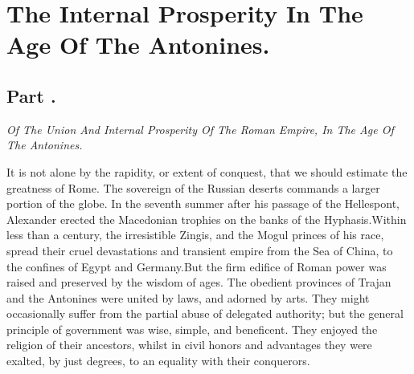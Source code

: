 \chapter{The Internal Prosperity In The Age Of The Antonines.}
\section{Part \thesection.}

\textit{Of The Union And Internal Prosperity Of The Roman Empire, In The
Age Of The Antonines.}
\vspace{\onelineskip}

It is not alone by the rapidity, or extent of conquest, that we
should estimate the greatness of Rome. The sovereign of the
Russian deserts commands a larger portion of the globe. In the
seventh summer after his passage of the Hellespont, Alexander
erected the Macedonian trophies on the banks of the Hyphasis.\footnotemark[1]
Within less than a century, the irresistible Zingis, and the
Mogul princes of his race, spread their cruel devastations and
transient empire from the Sea of China, to the confines of Egypt
and Germany.\footnotemark[2] But the firm edifice of Roman power was raised and
preserved by the wisdom of ages. The obedient provinces of Trajan
and the Antonines were united by laws, and adorned by arts. They
might occasionally suffer from the partial abuse of delegated
authority; but the general principle of government was wise,
simple, and beneficent. They enjoyed the religion of their
ancestors, whilst in civil honors and advantages they were
exalted, by just degrees, to an equality with their conquerors.



